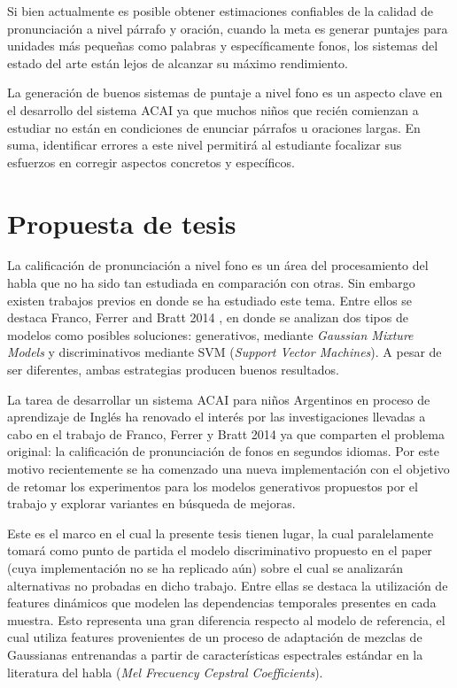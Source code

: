 \documentclass[a4paper,12pt]{article} %
\begin{document}
Si bien actualmente es posible obtener estimaciones confiables de la calidad
de pronunciación a nivel párrafo y oración, cuando la meta es generar puntajes 
para unidades más pequeñas como palabras y específicamente fonos, los sistemas del
estado del arte están lejos de alcanzar su máximo rendimiento.

La generación de buenos sistemas de puntaje a nivel fono es un aspecto clave en el 
desarrollo del sistema ACAI ya que muchos niños que recién comienzan a estudiar 
no están en condiciones de enunciar párrafos u oraciones largas. En suma, identificar 
errores a este nivel permitirá al estudiante focalizar sus esfuerzos en corregir 
aspectos concretos y específicos.


\section{Propuesta de tesis}

La calificación de pronunciación a nivel fono es un área del procesamiento del habla
que no ha sido tan estudiada en comparación con otras. Sin embargo existen
trabajos previos en donde se ha estudiado este tema. 
Entre ellos se destaca Franco, Ferrer and Bratt 2014 \cite{franco_ferrer_main_paper}, 
en donde se analizan 
dos tipos de modelos como posibles soluciones: generativos, mediante \textit{Gaussian 
Mixture Models} y discriminativos mediante SVM (\textit{Support Vector Machines}). 
A pesar de ser diferentes, ambas estrategias producen buenos resultados.

La tarea de desarrollar un sistema ACAI para niños Argentinos en proceso de 
aprendizaje de Inglés ha renovado el interés por las investigaciones llevadas
a cabo en el trabajo de Franco, Ferrer y Bratt 2014 ya que comparten el problema
original: la calificación de pronunciación de fonos en segundos idiomas. Por este motivo
recientemente se ha comenzado una nueva implementación con el objetivo de retomar
los experimentos para los modelos generativos propuestos por el trabajo y explorar 
variantes en búsqueda de mejoras.

Este es el marco en el cual la presente tesis tienen lugar, la cual paralelamente
tomará como punto de partida el modelo discriminativo propuesto en el paper (cuya
implementación no se ha replicado aún) sobre el cual se analizarán 
alternativas no probadas en dicho trabajo. 
Entre ellas se destaca la utilización de features dinámicos que modelen las dependencias
temporales presentes en cada muestra. Esto representa una gran diferencia 
respecto al modelo de referencia, el cual utiliza features provenientes de un proceso
de adaptación de mezclas de Gaussianas entrenandas a partir de características
espectrales estándar en la literatura del habla (\textit{Mel Frecuency Cepstral
Coefficients}).
\end{document}
